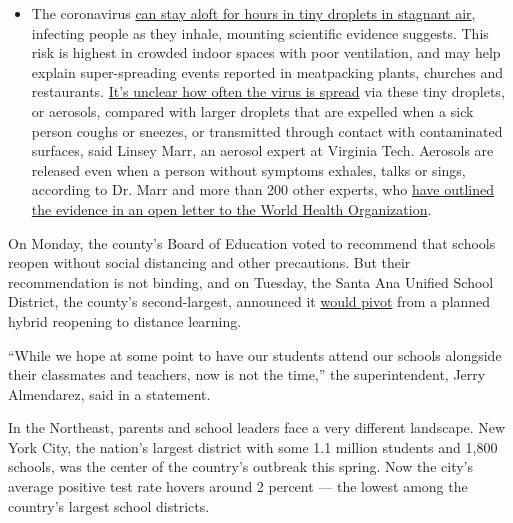 \begin{itemize}
  \begin{itemize}
  \tightlist
  \item
    The coronavirus
    \href{https://www.nytimes.com/2020/07/04/health/239-experts-with-one-big-claim-the-coronavirus-is-airborne.html?action=click\&pgtype=Article\&state=default\&region=MAIN_CONTENT_3\&context=storylines_faq}{can
    stay aloft for hours in tiny droplets in stagnant air}, infecting
    people as they inhale, mounting scientific evidence suggests. This
    risk is highest in crowded indoor spaces with poor ventilation, and
    may help explain super-spreading events reported in meatpacking
    plants, churches and restaurants.
    \href{https://www.nytimes.com/2020/07/06/health/coronavirus-airborne-aerosols.html?action=click\&pgtype=Article\&state=default\&region=MAIN_CONTENT_3\&context=storylines_faq}{It's
    unclear how often the virus is spread} via these tiny droplets, or
    aerosols, compared with larger droplets that are expelled when a
    sick person coughs or sneezes, or transmitted through contact with
    contaminated surfaces, said Linsey Marr, an aerosol expert at
    Virginia Tech. Aerosols are released even when a person without
    symptoms exhales, talks or sings, according to Dr. Marr and more
    than 200 other experts, who
    \href{https://academic.oup.com/cid/article/doi/10.1093/cid/ciaa939/5867798}{have
    outlined the evidence in an open letter to the World Health
    Organization}.
  \end{itemize}
\end{itemize}

On Monday, the county's Board of Education voted to recommend that
schools reopen without social distancing and other precautions. But
their recommendation is not binding, and on Tuesday, the Santa Ana
Unified School District, the county's second-largest, announced it
\href{https://www.sausd.us/site/default.aspx?PageType=3\&DomainID=1\&ModuleInstanceID=6157\&ViewID=6446EE88-D30C-497E-9316-3F8874B3E108\&RenderLoc=0\&FlexDataID=96385\&PageID=1}{would
pivot} from a planned hybrid reopening to distance learning.

``While we hope at some point to have our students attend our schools
alongside their classmates and teachers, now is not the time,'' the
superintendent, Jerry Almendarez, said in a statement.

In the Northeast, parents and school leaders face a very different
landscape. New York City, the nation's largest district with some 1.1
million students and 1,800 schools, was the center of the country's
outbreak this spring. Now the city's average positive test rate hovers
around 2 percent --- the lowest among the country's largest school
districts.

